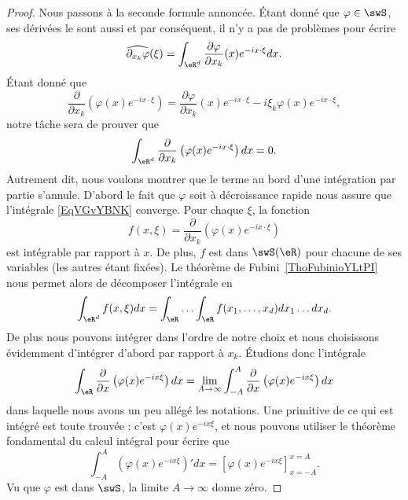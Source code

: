 \begin{proof}
    Nous passons à la seconde formule annoncée. Étant donné que \( \varphi\in\swS\), ses dérivées le sont aussi et par conséquent, il n'y a pas de problèmes pour écrire
    \begin{equation}    \label{EqTYizlnia}
        \widehat{\partial_{x_k}\varphi}(\xi)=\int_{\eR^d}\frac{ \partial \varphi }{ \partial x_k }(x) e^{-ix\cdot \xi}dx.
    \end{equation}
    Étant donné que
    \begin{equation}    \label{EqZAeYaCB}
        \frac{ \partial  }{ \partial x_k }\left( \varphi(x) e^{-ix\cdot\xi} \right)=\frac{ \partial \varphi }{ \partial x_k }(x) e^{-ix\cdot\xi}-i\xi_k\varphi(x) e^{-ix\cdot \xi},
    \end{equation}
    notre tâche sera de prouver que
    \begin{equation}    \label{EqVGvYBNK}
        \int_{\eR^d}\frac{ \partial  }{ \partial x_k }\left( \varphi(x) e^{-ix\cdot \xi} \right)dx=0.
    \end{equation}
    Autrement dit, nous voulons montrer que le terme au bord d'une intégration par partie s'annule. D'abord le fait que \( \varphi\) soit à décroissance rapide nous assure que l'intégrale \eqref{EqVGvYBNK} converge. Pour chaque \( \xi\), la fonction
    \begin{equation}
        f(x,\xi)=\frac{ \partial}{\partial x_k }\left( \varphi(x) e^{-ix\cdot \xi} \right)
    \end{equation}
    est intégrable par rapport à \( x\). De plus, \( f\) est dans \( \swS(\eR)\) pour chacune de ses variables (les autres étant fixées). Le théorème de Fubini~\ref{ThoFubinioYLtPI} nous permet alors de décomposer l'intégrale en
    \begin{equation}
        \int_{\eR^d}f(x,\xi)dx=\int_{\eR}\ldots\int_{\eR} f(x_1,\ldots, x_d)dx_1\ldots dx_d.
    \end{equation}
    De plus nous pouvons intégrer dans l'ordre de notre choix et nous choisissons évidemment d'intégrer d'abord par rapport à \( x_k\).  Étudions donc l'intégrale
    \begin{equation}
        \int_{\eR}\frac{ \partial  }{ \partial x }\left( \varphi(x) e^{-ix\xi} \right)dx=\lim_{A\to\infty}\int_{-A}^A\frac{ \partial  }{ \partial x }\left( \varphi(x) e^{-ix\xi} \right)dx
    \end{equation}
    dans laquelle nous avons un peu allégé les notations. Une primitive de ce qui est intégré est toute trouvée : c'est \( \varphi(x) e^{-ix\xi}\), et nous pouvons utiliser le théorème fondamental du calcul intégral pour écrire que
    \begin{equation}
        \int_{-A}^A\left( \varphi(x) e^{-ix\xi} \right)'dx=\left[ \varphi(x) e^{-ix\xi} \right]_{x=-A}^{x=A}.
    \end{equation}
    Vu que \( \varphi\) est dans \( \swS\), la limite \( A\to\infty\) donne zéro.


\end{proof}
